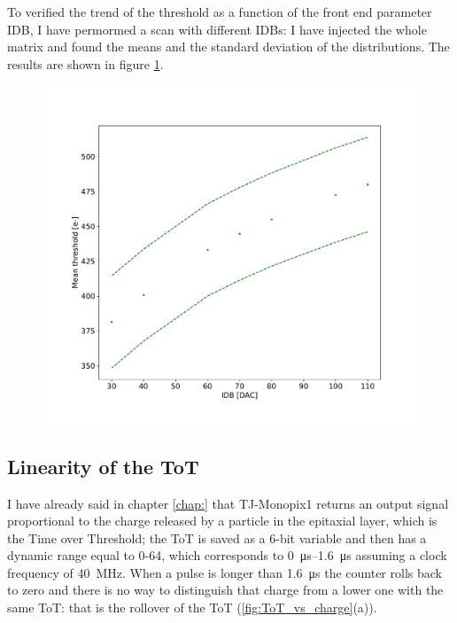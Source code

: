         To verified the trend of the threshold as a function of the front end parameter IDB, I have permormed a scan with different IDBs: I have injected the whole matrix and found the means and the standard deviation of the distributions. The results are shown in figure \ref{fig:threshold_vs_IDB}.
        \begin{figure}[h!]
            \centering
            \includegraphics[width=.75\linewidth]{figures/charaterization/thr_vs_IDB.pdf}
            \caption{}
            \label{fig:threshold_vs_IDB}
        \end{figure}            
   

    \subsection{Linearity of the ToT}    
        I have already said in chapter \ref{chap:} that TJ-Monopix1 returns an output signal  proportional to the charge released by a particle in the epitaxial layer, which is the Time over Threshold; the ToT is saved as a 6-bit variable and then has a dynamic range equal to 0-64, which corresponds to \SIrange{0}{1.6}{\us} assuming a clock frequency of \SI{40}{MHz}.
        When a pulse is longer than \SI{1.6}{\us} the counter rolls back to zero and there is no way to distinguish that charge from a lower one with the same ToT: that is the rollover of the ToT (\ref{fig:ToT_vs_charge}(a)).   

